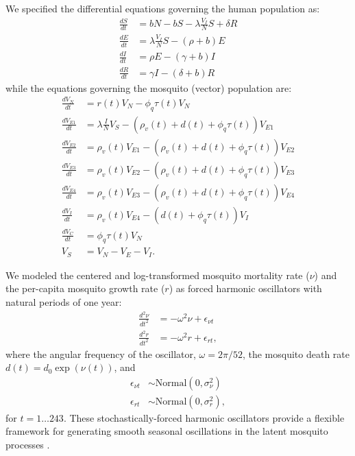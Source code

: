 \documentclass[10pt,letterpaper]{article}
\begin{document}
We specified the differential equations governing the human population as:
\begin{align} 
\frac{dS}{dt} &= bN - bS - \lambda \frac{V_{I}}{N} S + \delta R\\
\frac{dE}{dt} &= \lambda \frac{V_{I}}{N} S - (\rho + b)E\\
\frac{dI}{dt} &= \rho E - (\gamma + b)I\\
\frac{dR}{dt} &= \gamma I - (\delta + b)R
\end{align}
while the equations governing the mosquito (vector) population are:
\begin{align}
\frac{dV_N}{dt} & = r(t) V_N - \phi_q \tau(t) V_N \\
\frac{dV_{E1}}{dt} &= \lambda \frac{I}{N} V_S - (\rho_{v}(t) + d(t) + \phi_q \tau(t))V_{E1}\\
\frac{dV_{E2}}{dt} &= \rho_{v}(t) V_{E1} - (\rho_{v}(t) + d(t) + \phi_q \tau(t))V_{E2}\\
\frac{dV_{E3}}{dt} &= \rho_{v}(t) V_{E2}  - (\rho_{v}(t) + d(t) + \phi_q \tau(t))V_{E3}\\
\frac{dV_{E4}}{dt} &= \rho_{v}(t) V_{E3}  - (\rho_{v}(t) + d(t) + \phi_q \tau(t))V_{E4}\\
\frac{dV_I}{dt} &= \rho_{v}(t) V_{E4} - (d(t) + \phi_q \tau(t)) V_I\\
\frac{dV_C}{dt} & = \phi_q \tau(t) V_N\\
V_S &= V_N - V_E - V_I.
\end{align}

We modeled the centered and log-transformed mosquito mortality rate ($\nu$) and the per-capita mosquito growth rate ($r$) as forced harmonic oscillators with natural periods of one year:
\begin{align}
\frac{d^2\nu}{dt^2} &= -\omega^2 \nu + \epsilon_{\nu t}\\
\frac{d^2 r}{dt^2} &= -\omega^2 r + \epsilon_{rt},
\end{align}
where the angular frequency of the oscillator, $\omega = 2\pi / 52$, the mosquito death rate $d(t) = d_0 \exp(\nu(t))$, and
\begin{align}
\epsilon_{\nu t} & \sim \text{Normal}(0, \sigma^2_{\nu})\\
\epsilon_{rt} & \sim \text{Normal}(0, \sigma^2_r),
\end{align}
for $t = 1 \dots 243$.
These stochastically-forced harmonic oscillators provide a flexible framework for generating smooth seasonal oscillations in the latent mosquito processes \cite{Ramsay2017}.
\end{document}
